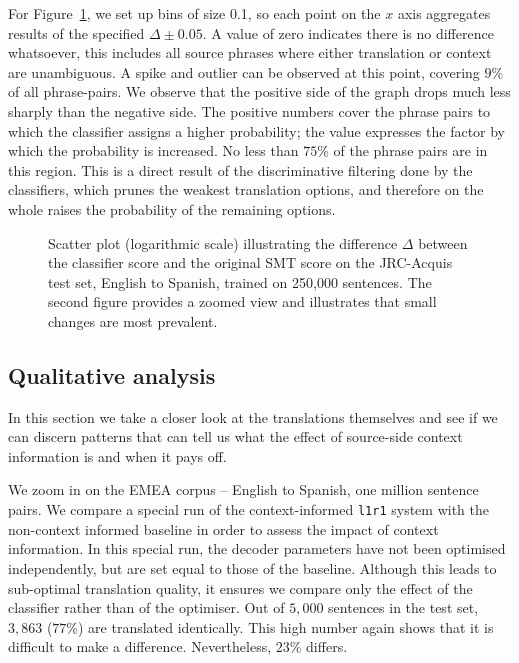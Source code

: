 For Figure~\ref{fig:scoredifference}, we set up bins of size 0.1, so each point
on the $x$ axis aggregates results of the specified $\Delta \pm 0.05$. A
value of zero indicates there is no difference whatsoever, this includes all
source phrases where either translation or context are unambiguous. A spike and
outlier can be observed at this point, covering $9\%$ of
all phrase-pairs. We observe that the positive side of the graph drops much
less sharply than the negative side. The positive numbers cover the phrase
pairs to which the classifier assigns a higher probability; the value expresses
the factor by which the probability is increased. No less than $75\%$ of the
phrase pairs are in this region. This is a direct result of the discriminative
filtering done by the classifiers, which prunes the weakest translation
options, and therefore on the whole raises the probability of the remaining
options.

\begin{figure}
\begin{center}
\setlength\figureheight{5cm}
\setlength\figurewidth{5cm}
 
\caption{Scatter plot (logarithmic scale) illustrating the difference $\Delta$
between the classifier score and the original SMT score on the JRC-Acquis
 test set, English to Spanish, trained on 250,000 sentences. The second figure provides a zoomed view and illustrates that small changes are most prevalent.}
\label{fig:scoredifference}
\end{center}
\end{figure}


\subsection{Qualitative analysis}
\label{sec:qualanal}

In this section we take a closer look at the translations themselves and see if
we can discern patterns that can tell us what the effect of source-side context
information is and when it pays off.

We zoom in on the EMEA corpus -- English to Spanish, one million sentence
pairs. We compare a special run of the context-informed \texttt{l1r1} system
with the non-context informed baseline in order to assess the impact of context
information. In this special run, the decoder parameters have not been
optimised independently, but are set equal to those of the baseline. Although
this leads to sub-optimal translation quality, it ensures we compare only the
effect of the classifier rather than of the optimiser. Out of $5,000$ sentences
in the test set, $3,863$ ($77\%$) are translated identically. This high number
again shows that it is difficult to make a difference. Nevertheless, $23\%$
differs.

